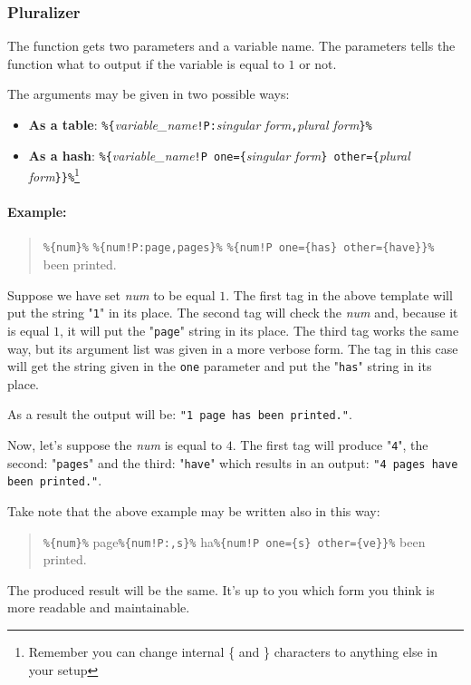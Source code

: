 \subsubsection{Pluralizer}
The function gets two parameters and a variable name. The parameters tells the function what to output if the variable is equal to $1$ or not.

The arguments may be given in two possible ways:
\begin{itemize}
	\item \textbf{As a table}: \verb+%{+\textit{variable\_name}\verb+!P:+\textit{singular form}\verb+,+\textit{plural form}\verb+}%+
	\item \textbf{As a hash}: \verb+%{+\textit{variable\_name}\verb+!P one={+\textit{singular form}\verb+} other={+\textit{plural form}\verb+}}%+\footnote{Remember you can change internal \{
	and \} characters to anything else in your setup}
\end{itemize}

\paragraph{Example:}
\begin{quote}
	\verb+%{num}%+ \verb+%{num!P:page,pages}%+ \verb+%{num!P one={has} other={have}}%+ been printed.
\end{quote}
Suppose we have set \textit{num} to be equal $1$. The first tag in the above template will put the string "\texttt{1}" in its place.
The second tag will check the \textit{num} and, because it is equal $1$, it will put the "\texttt{page}" string in its place.
The third tag works the same way, but its argument list was given in a more verbose form. The tag in this case will get the string given in the \texttt{one} parameter
and put the "\texttt{has}" string in its place.

As a result the output will be: \texttt{"1 page has been printed."}.

Now, let's suppose the \textit{num} is equal to $4$. 
The first tag will produce "\texttt{4}", the second: "\texttt{pages}" and the third: "\texttt{have}" which results in an output:
\texttt{"4 pages have been printed."}.

\vspace{2em}

Take note that the above example may be written also in this way:
\begin{quote}
	\verb+%{num}%+ page\verb+%{num!P:,s}%+ ha\verb+%{num!P one={s} other={ve}}%+ been printed.
\end{quote}
The produced result will be the same. It's up to you which form you think is more readable and maintainable. 

